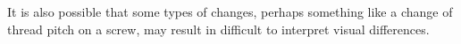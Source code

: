 \documentclass[sigconf,]{acmart}
\begin{document}
It is also possible that some types of changes, perhaps something like a change of thread pitch on a screw, may result in difficult to interpret visual differences.




\section{}






\end{document}
